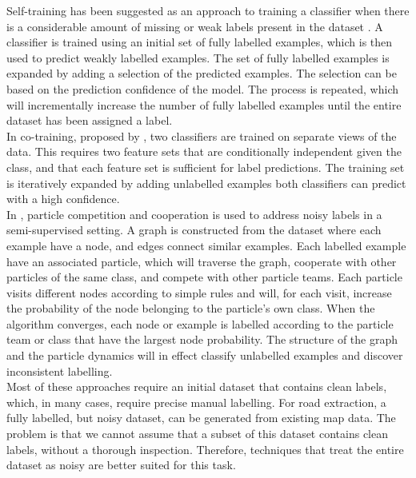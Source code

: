 Self-training has been suggested as an approach to training a classifier when there is a considerable amount of missing or weak labels present in the dataset \citep{Rosenberg_self-training}. A classifier is trained using an initial set of fully labelled examples, which is then used to predict weakly labelled examples. The set of fully labelled examples is expanded by adding a selection of the predicted examples. The selection can be based on the prediction confidence of the model. The process is repeated, which will incrementally increase the number of fully labelled examples until the entire dataset has been assigned a label. \\

In co-training, proposed by \cite{Blum_co-training}, two classifiers are trained on separate views of the data. This requires two feature sets that are conditionally independent given the class, and that each feature set is sufficient for label predictions. The training set is iteratively expanded by adding unlabelled examples both classifiers can predict with a high confidence. \\

In \citep{Breve_particle}, particle competition and cooperation is used to address noisy labels in a semi-supervised setting. A graph is constructed from the dataset where each example have a node, and edges connect similar examples. Each labelled example have an associated particle, which will traverse the graph, cooperate with other particles of the same class, and compete with other particle teams. Each particle visits different nodes according to simple rules and will, for each visit, increase the probability of the node belonging to the particle's own class. When the algorithm converges, each node or example is labelled according to the particle team or class that have the largest node probability. The structure of the graph and the particle dynamics will in effect classify unlabelled examples and discover inconsistent labelling. \\

Most of these approaches require an initial dataset that contains clean labels, which, in many cases, require precise manual labelling. For road extraction, a fully labelled, but noisy dataset, can be generated from existing map data. The problem is that we cannot assume that a subset of this dataset contains clean labels, without a thorough inspection. Therefore, techniques that treat the entire dataset as noisy are better suited for this task. 

